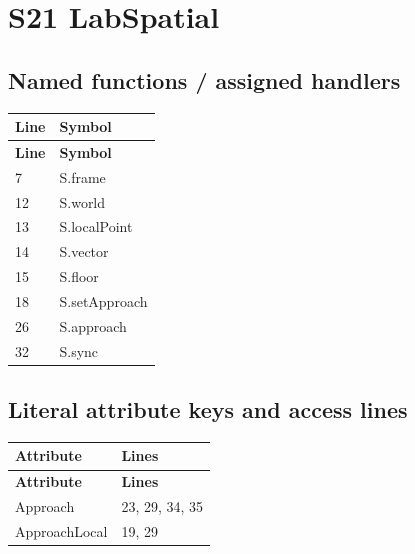 \section{S21 LabSpatial}
\subsection{Named functions /\allowbreak{} assigned handlers}
\begin{longtable}{p{}p{}}
\toprule
\textbf{Line} & \textbf{Symbol} \\ \midrule
\endfirsthead
\textbf{Line} & \textbf{Symbol} \\ \midrule
\endhead
7 & S.\allowbreak{}frame \\
12 & S.\allowbreak{}world \\
13 & S.\allowbreak{}localPoint \\
14 & S.\allowbreak{}vector \\
15 & S.\allowbreak{}floor \\
18 & S.\allowbreak{}setApproach \\
26 & S.\allowbreak{}approach \\
32 & S.\allowbreak{}sync \\
\bottomrule
\end{longtable}
\subsection{Literal attribute keys and access lines}
\begin{longtable}{p{}p{}}
\toprule
\textbf{Attribute} & \textbf{Lines} \\ \midrule
\endfirsthead
\textbf{Attribute} & \textbf{Lines} \\ \midrule
\endhead
Approach & 23, 29, 34, 35 \\
ApproachLocal & 19, 29 \\
\bottomrule
\end{longtable}
